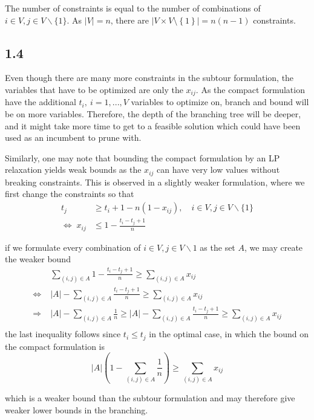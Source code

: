 \documentclass[12pt]{article}
\begin{document}
The number of constraints is equal to the number of combinations of $i \in V, j \in V \backslash\{1\}$. As $|V| = n$, there are $\left|V \times V \setminus \left\{1\right\} \right| = n(n-1)$ constraints.


\subsection*{1.4}
Even though there are many more constraints in the subtour formulation, the variables that have to be optimized are only the $x_{ij}$. As the compact formulation have the additional $t_i, \ i = 1,...,V$ variables to optimize on, branch and bound will be on more variables. Therefore, the depth of the branching tree will be deeper, and it might take more time to get to a feasible solution which could have been used as an incumbent to prune with.

Similarly, one may note that bounding the compact formulation by an LP relaxation yields weak bounds as the $x_{ij}$ can have very low values without breaking constraints. This is observed in a slightly weaker formulation, where we first change the constraints so that
\begin{align*}
t_j & \geq t_i + 1 - n(1 - x_{ij}), \quad i\in V, j\in V\backslash \{1\}\\
\Leftrightarrow \; x_{ij}& \leq  1 - \frac{t_i - t_j + 1}{n}
\end{align*}

if we formulate every combination of $i\in V, j \in V\backslash {1}$ as the set $A$, we may create the weaker bound
\begin{align*}
&\sum_{(i,j)\in A} 1 - \frac{t_i - t_j +1}{n} \geq \sum_{(i,j)\in A} x_{ij}\\
\Leftrightarrow \; & |A| - \sum_{(i,j)\in A} \frac{t_i - t_j + 1}{n} \geq \sum_{(i,j)\in A} x_{ij}\\
\Rightarrow  \; & |A| - \sum_{(i,j)\in A} \frac{1}{n} \geq |A| - \sum_{(i,j)\in A} \frac{t_i - t_j + 1}{n} \geq \sum_{(i,j)\in A} x_{ij}\\
\end{align*}
the last inequality follows since $t_i \leq t_j$ in the optimal case, in which  the bound on the compact formulation is
$$
|A|\left(1 - \sum_{(i,j)\in A} \frac{1}{n}\right) \geq \sum_{(i,j)\in A} x_{ij}
$$

which is a weaker bound than the subtour formulation and may therefore give weaker lower bounds in the branching. 
\end{document}
